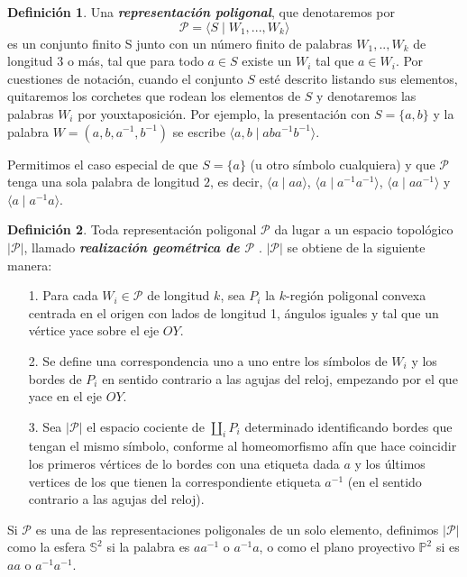 \documentclass[10pt]{report}
\theoremstyle{definition}
\newtheorem{defin}{Definición}[section]
\begin{document}
\begin{defin}%
\label{def:rep_pol}
Una \textbf{\textit{representación poligonal}}, que denotaremos por $$\mathcal{P}=\langle S\mid W_1,...,W_k\rangle$$ es un conjunto finito S junto con un número finito de palabras $W_1,..,W_k$ de longitud $3$ o más, tal que para todo $a\in S$ existe un $W_i$ tal que $a\in W_i$. Por cuestiones de notación, cuando el conjunto $S$ esté descrito listando sus elementos, quitaremos los corchetes que rodean los elementos de $S$ y denotaremos las palabras $W_i$ por youxtaposición. Por ejemplo, la presentación con $S=\{a,b\}$ y la palabra $W=(a,b,a^{-1},b^{-1})$ se escribe $\langle a,b\mid  aba^{-1}b^{-1}\rangle$. 

Permitimos el caso especial de que $S=\{a\}$ (u otro símbolo cualquiera) y que $\mathcal{P}$ tenga una sola palabra de longitud $2$, es decir, $\langle a\mid aa\rangle$, $\langle a\mid a^{-1}a^{-1}\rangle$, $\langle a\mid aa^{-1}\rangle$ y $\langle a\mid a^{-1}a\rangle$.

\end{defin}

\begin{defin}%
Toda representación poligonal $\mathcal{P}$ da lugar a un espacio topológico $|\mathcal{P}|$, llamado \textbf{\textit{realización geométrica de $\mathcal{P}$}} . $|\mathcal{P}|$ se obtiene de la siguiente manera:
\begin{itemize}
\item[1.] Para cada $W_i\in \mathcal{P}$ de longitud $k$, sea $P_i$ la $k$-región poligonal convexa centrada en el origen con lados de longitud 1, ángulos iguales y tal que un vértice yace sobre el eje $OY$.
\item[2.] Se define una correspondencia uno a uno entre los símbolos de $W_ i$ y los bordes de $P_i$ en sentido contrario a las agujas del reloj, empezando por el que yace en el eje $OY$.
\item[3.] Sea $|\mathcal{P}|$ el espacio cociente de $\coprod_i P_i$ determinado identificando bordes que tengan el mismo símbolo, conforme al homeomorfismo afín que hace coincidir los primeros vértices de lo bordes con una etiqueta dada $a$ y los últimos vertices de los que tienen la correspondiente etiqueta $a^{-1}$ (en el sentido contrario a las agujas del reloj).

\end{itemize}


Si $\mathcal{P}$ es una de las representaciones poligonales de un solo elemento, definimos $|\mathcal{P}|$ como la esfera $\mathbb{S}^2$ si la palabra es $aa^{-1}$ o $a^{-1}a$, o como el plano proyectivo $\mathbb{P}^2$ si es $aa$ o $a^{-1}a^{-1}$.%
\end{defin}
\end{document}
